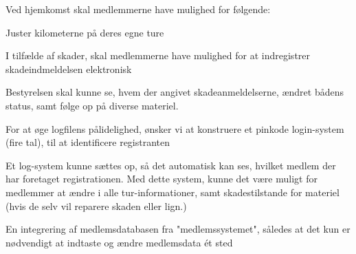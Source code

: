 \begin{itemize_small}
\item Ved hjemkomst skal medlemmerne have mulighed for følgende:
\begin{itemize_small}
\item Juster kilometerne på deres egne ture
\item I tilfælde af skader, skal medlemmerne have mulighed for at indregistrer skadeindmeldelsen elektronisk
\end{itemize_small}

\item Bestyrelsen skal kunne se, hvem der angivet skadeanmeldelserne, ændret bådens status, samt følge op på diverse materiel.
\begin{itemize_small}
\item For at øge logfilens pålidelighed, ønsker vi at konstruere et pinkode login-system (fire tal), til at identificere registranten
\item Et log-system kunne sættes op, så det automatisk kan ses, hvilket medlem der har foretaget registrationen. Med dette system, kunne det være muligt for medlemmer at ændre i alle tur-informationer, samt skadestilstande for materiel (hvis de selv vil reparere skaden eller lign.)
\end{itemize_small}

\item En integrering af medlemsdatabasen fra "medlemssystemet", således at det kun er nødvendigt at indtaste og ændre medlemsdata ét sted

\end{itemize_small}




